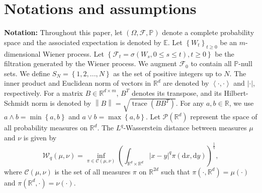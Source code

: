 \documentclass[12pt]{article}
\numberwithin{equation}{section}
\begin{document}
\section{Notations and assumptions}\label{Notations and assumptions}
\textbf{Notation:} Throughout this paper, let $\left(\Omega, \mathcal{F}, \mathbb{P}\right)$  denote a complete  probability space and the associated expectation is denoted by $\mathbb{E}$. Let   
 $\left\{W_t\right\}_{t \geq 0}$ be an  $m$-dimensional Wiener process.  Let  $\left\{ \mathcal{F}_t =\sigma(W_s, 0\le s\le t), t\ge 0\right\}$ be the filtration  generated by the 
Wiener process. We augment   $\mathcal{F}_0$ to contain all $\mathbb{P}$-null sets.       We define $S_{N}=\left\{ 1,2,...,N \right\} $ as the set of positive integers up to  $N$. The inner product and Euclidean norm of vectors in $\mathbb{R}^d$ are denoted by  $\left< \cdot ,\cdot \right>$ and $\left|\cdot\right|$, respectively. For a matrix $ B \in \mathbb{R}^{d \times m} $, $ B^T $ denotes its transpose, and its Hilbert-Schmidt norm is denoted by   $ \left\|B\right\| = \sqrt{\operatorname{trace}\left(B B^T\right)} $. For any $a, b \in \mathbb{R}$, we use $a \wedge b=\min \left\{a, b\right\}$ and $a \vee b=\max \left\{a, b\right\}$.  Let $\mathcal{P}\left(\mathbb{R}^d\right)$ represent the space of all probability measures on $\mathbb{R}^d$. 
The $L^q$-Wasserstein distance between measures $\mu$ and $\nu$ is given by
\begin{equation}\tag{2.1}\label{2.1}
\mathcal{W}_q\left(\mu, \nu\right)=\inf _{\pi \in \mathcal{C}\left(\mu, \nu\right)}\left(\int_{\mathbb{R}^d \times \mathbb{R}^d}\left|x-y\right|^q \pi\left(\mathrm{d} x, \mathrm{d} y\right)\right)^{\frac{1}{q}},
\end{equation}
where $\mathcal{C}\left(\mu, \nu\right)$ is the set of all measures $\pi$ on $\mathbb{R}^{2d}$ such that    $\pi\left(\cdot, \mathbb{R}^d\right)=\mu\left(\cdot\right)$ and $\pi\left(\mathbb{R}^d, \cdot\right)=\nu\left(\cdot\right)$. 
\end{document}
